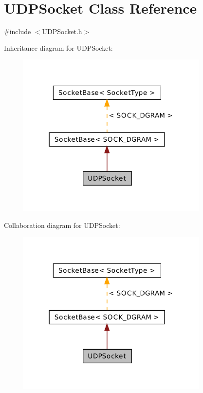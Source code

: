 \hypertarget{class_u_d_p_socket}{\section{U\-D\-P\-Socket Class Reference}
\label{class_u_d_p_socket}
}


{\ttfamily \#include $<$U\-D\-P\-Socket.\-h$>$}



Inheritance diagram for U\-D\-P\-Socket\-:\nopagebreak
\begin{figure}[H]
\begin{center}
\leavevmode
\includegraphics[width=271pt]{class_u_d_p_socket__inherit__graph}
\end{center}
\end{figure}


Collaboration diagram for U\-D\-P\-Socket\-:\nopagebreak
\begin{figure}[H]
\begin{center}
\leavevmode
\includegraphics[width=271pt]{class_u_d_p_socket__coll__graph}
\end{center}
\end{figure}
